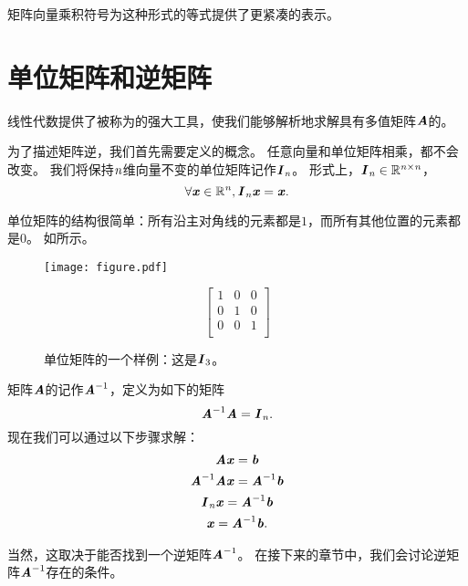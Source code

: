 矩阵向量乘积符号为这种形式的等式提供了更紧凑的表示。





\section{单位矩阵和逆矩阵}
\label{sec:identity_and_inverse_atrices}


线性代数提供了被称为的强大工具，使我们能够解析地求解具有多值矩阵$\MA$的。


为了描述矩阵逆，我们首先需要定义的概念。
任意向量和单位矩阵相乘，都不会改变。
我们将保持$\Sn$维向量不变的单位矩阵记作$\MI_{\Sn}$。
形式上，$\MI_{\Sn}\in \SetR^{\Sn\times \Sn}$，
\begin{equation}
    \forall \Vx \in \SetR^{\Sn}, \MI_{\Sn} \Vx = \Vx.
\end{equation}


单位矩阵的结构很简单：所有沿主对角线的元素都是$1$，而所有其他位置的元素都是$0$。
如所示。

\begin{figure}[!htb]
\ifOpenSource
\centerline{\texttt{[image: figure.pdf]}}
\else
\centering
\begin{equation}
\begin{bmatrix} 
1 & 0 & 0 \\
0 & 1 & 0 \\
0 & 0 & 1 \\
\end{bmatrix}
\end{equation}
\fi
\caption{单位矩阵的一个样例：这是$\MI_3$。}
\label{fig:chap2_empty2}
\end{figure}


矩阵$\MA$的记作$\MA^{-1}$，定义为如下的矩阵
\begin{equation} \MA^{-1}\MA = \MI_{\Sn}. \end{equation}
现在我们可以通过以下步骤求解：
\begin{gather}
\MA\Vx=\Vb \\
\MA^{-1}\MA\Vx = \MA^{-1}\Vb \\
\MI_{\Sn} \Vx=\MA^{-1}\Vb \\
\Vx=\MA^{-1}\Vb. 
\end{gather}


当然，这取决于能否找到一个逆矩阵$\MA^{-1}$。
在接下来的章节中，我们会讨论逆矩阵$\MA^{-1}$存在的条件。


